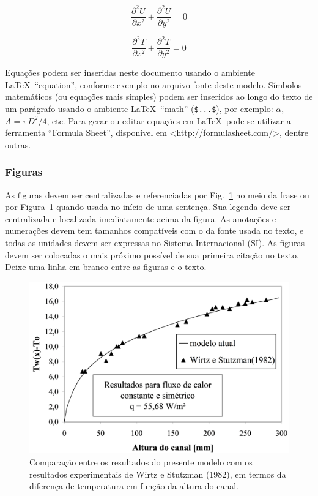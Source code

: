 \documentclass[%
  article,%
  10pt,%
  a4paper,%
  fleqn,%
  oneside,%
  sumario = tradicional,%
  chapter = TITLE,%
  section = TITLE,%
]{abntex2}
\begin{document}
\begin{equation}\label{eq:Uxy}
\frac{\partial^2 U}{\partial x^2} + \frac{\partial^2 U}{\partial y^2} = 0
\end{equation}

\begin{equation}\label{eq:Txy}
\frac{\partial^2 T}{\partial x^2} + \frac{\partial^2 T}{\partial y^2} = 0
\end{equation}

Equações podem ser inseridas neste documento usando o ambiente \LaTeX\ ``equation'', conforme exemplo no arquivo fonte deste modelo. Símbolos matemáticos (ou equações mais simples) podem ser inseridos ao longo do texto de um parágrafo usando o ambiente \LaTeX\ ``math'' (\verb|$...$|), por exemplo: $\alpha$, $A = \pi D^{2} /4$, etc. Para gerar ou editar equações em \LaTeX\ pode-se utilizar a ferramenta ``Formula Sheet'', disponível em <\url{http://formulasheet.com/}>, dentre outras.

\subsubsection{Figuras}\label{sssec:figs}

As figuras devem ser centralizadas e referenciadas por Fig.~\ref{fig:grafico} no meio da frase ou por Figura~\ref{fig:grafico} quando usada no início de uma sentença. Sua legenda deve ser centralizada e localizada imediatamente acima da figura. As anotações e numerações devem tem tamanhos compatíveis com o da fonte usada no texto, e todas as unidades devem ser expressas no Sistema Internacional (SI). As figuras devem ser colocadas o mais próximo possível de sua primeira citação no texto. Deixe uma linha em branco entre as figuras e o texto.

\begin{figure}[!htb]
\centering
\caption{Comparação entre os resultados do presente modelo com os resultados experimentais de Wirtz e Stutzman (1982), em termos da diferença de temperatura em função da altura do canal.}
\label{fig:grafico}
\includegraphics[width = 0.5\columnwidth]{./Figuras/grafico}
\end{figure}
\end{document}
